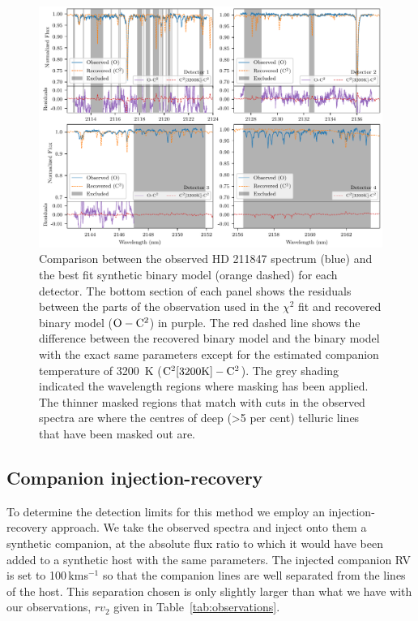 \documentclass[fleqn,usenatbib]{mnras}
\newcommand{\kmps}{\,kms\(^{-1}\)}	%
\begin{document}
    
    \begin{figure}
        \centering
        \includegraphics[width=0.8\hsize]{images/fig6.pdf}
        \caption{Comparison between the observed {HD 211847} spectrum (blue) and the best fit synthetic binary model (orange dashed) for each detector. The bottom section of each panel shows the residuals between the parts of the observation used in the \(\chi^2\) fit and recovered binary model (\(\rm O-C^2\)) in purple. The red dashed line shows the difference between the recovered binary model and the binary model with the exact same parameters except for the estimated companion temperature of 3200~K (\(\rm C^2[3200K]- C^2\)). The grey shading indicated the wavelength regions where masking has been applied. The thinner masked regions that match with cuts in the observed spectra are where the centres of deep (>5 per cent) telluric lines that have been masked out are.}
        \label{fig:visualinspection-hd2118471}
    \end{figure}
    
    \subsection{Companion injection-recovery}
    \label{subsection:injection-recovery}
    To determine the detection limits for this method we employ an injection-recovery approach. We take the observed spectra and inject onto them a synthetic companion, at the absolute flux ratio to which it would have been added to a synthetic host with the same parameters. The injected companion RV is set to 100\kmps{} so that the companion lines are well separated from the lines of the host. This separation chosen is only slightly larger than what we have with our observations, \(rv_2\) given in Table~\ref{tab:observations}.
    
\end{document}
